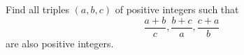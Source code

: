 Find all triples $(a,b,c)$ of positive integers such that
$$\frac{a+b}{c},\frac{b+c}{a},\frac{c+a}{b}$$
are also positive integers.
